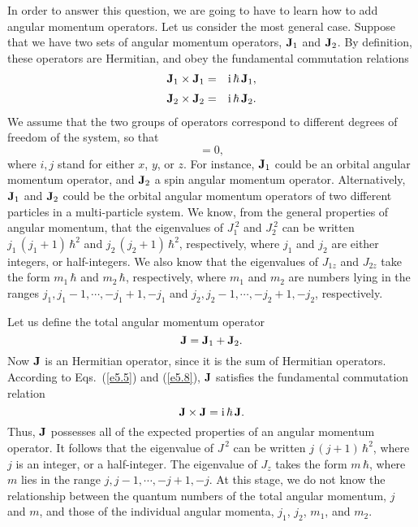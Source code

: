 In order to answer this question, we are going to have to learn how to add
angular momentum operators. Let us consider the most general case. Suppose
that we have two sets of angular momentum operators, ${\bf J}_1$ and ${\bf J}_2$.
By definition, these operators are Hermitian, and obey the fundamental commutation
relations
\begin{eqnarray}
{\bf J}_1\times {\bf J}_1& =& {\rm i}\,\hbar\,{\bf J}_1,\\[0.5ex]
{\bf J}_2\times {\bf J}_2& =& {\rm i}\,\hbar\,{\bf J}_2.
\end{eqnarray}
We assume that the two groups of operators  correspond to different degrees
of freedom of the system, so that 
\begin{equation}
[J_{1i}, J_{2j}] = 0,
\end{equation}
where $i, j$ stand for either $x$, $y$, or $z$. 
For instance, ${\bf J}_1$ could be an orbital angular momentum operator, and ${\bf J}_2$
a spin angular momentum operator. Alternatively, ${\bf J}_1$ and ${\bf J}_2$ could
be the orbital angular momentum operators
 of two different particles in a multi-particle
system. We know, from the general
properties of angular momentum, that the eigenvalues of $J_1^{~2}$ and $J_2^{~2}$ 
can be
written $j_1\,(j_1+1)\,\hbar^2$ and $j_2\,(j_2+1)\, \hbar^2$, respectively, where
$j_1$ and $j_2$ are either integers, or half-integers. We also know that the
eigenvalues of $J_{1z}$ and $J_{2z}$ take the form $m_1\,\hbar$ and
$m_2\,\hbar$, respectively, where $m_1$ and $m_2$ are numbers
lying  in the ranges $j_1, j_1-1,\cdots,
-j_1+1, -j_1$ and  $j_2, j_2-1,\cdots,
-j_2+1, -j_2$, respectively.

Let us define the total angular momentum operator
\begin{equation}
{\bf J} = {\bf J}_1 + {\bf J}_2.
\end{equation}
Now  ${\bf J}$ is an Hermitian operator, since it is the sum of Hermitian operators. 
According to Eqs.~(\ref{e5.5}) and (\ref{e5.8}), ${\bf J}$ satisfies the fundamental commutation
relation
\begin{equation}
{\bf J} \times {\bf J} = {\rm i}\,\hbar\, {\bf J}.
\end{equation}
Thus, ${\bf J}$ possesses all of the expected properties of an
angular momentum operator. It follows that the eigenvalue of $J^{\,2}$ can be
written $j\,(j+1)\,\hbar^2$, where $j$ is an integer, or a half-integer. The eigenvalue
of $J_z$ takes the form $m\,\hbar$, where $m$ lies in the range $j, j-1,\cdots,
-j+1, -j$. At this stage, we do not know the relationship between the quantum
numbers of the total angular momentum, $j$ and $m$, and those of the
individual angular momenta, $j_1$, $j_2$, $m_1$, and $m_2$. 

